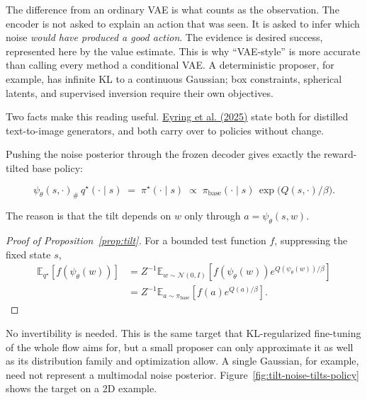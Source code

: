 The difference from an ordinary VAE is what counts as the observation. The encoder is not asked to explain an action that was seen. It is asked to infer which noise \emph{would have produced a good action}. The evidence is desired success, represented here by the value estimate. This is why ``VAE-style'' is more accurate than calling every method a conditional VAE. A deterministic proposer, for example, has infinite KL to a continuous Gaussian; box constraints, spherical latents, and supervised inversion require their own objectives.

Two facts make this reading useful. \hyperlink{ref:6}{Eyring et al. (2025)} state both for distilled text-to-image generators, and both carry over to policies without change.

\begin{proposition}\label{prop:tilt}
Pushing the noise posterior through the frozen decoder gives exactly the reward-tilted base policy:

\begin{equation}
\psi_\theta(s, \cdot)_{\#}\, q^\star(\cdot \mid s) \;=\; \pi^\star(\cdot \mid s) \;\propto\; \pi_{\text{base}}(\cdot \mid s)\, \exp\big(Q(s, \cdot)/\beta\big).
\end{equation}
\end{proposition}
The reason is that the tilt depends on $w$ only through $a = \psi_\theta(s, w)$.

\begin{proof}[Proof of Proposition~\ref{prop:tilt}]
For a bounded test function $f$, suppressing the fixed state $s$,
\begin{equation*}
\begin{aligned}
\mathbb{E}_{q^\star}[f(\psi_\theta(w))]
&= Z^{-1}\mathbb{E}_{w\sim\mathcal{N}(0,I)}
   [f(\psi_\theta(w))e^{Q(\psi_\theta(w))/\beta}] \\
&= Z^{-1}\mathbb{E}_{a\sim\pi_{\text{base}}}
   [f(a)e^{Q(a)/\beta}].
\end{aligned}
\end{equation*}
\end{proof}

No invertibility is needed. This is the same target that KL-regularized fine-tuning of the whole flow aims for, but a small proposer can only approximate it as well as its distribution family and optimization allow. A single Gaussian, for example, need not represent a multimodal noise posterior. Figure~\ref{fig:tilt-noise-tilts-policy} shows the target on a 2D example.

